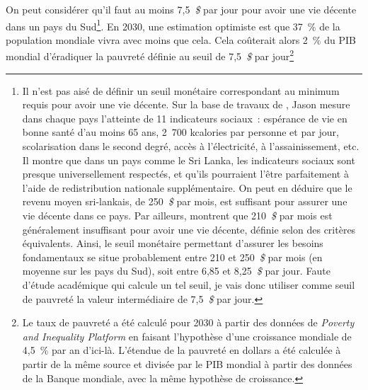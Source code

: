 \documentclass[a5paper,french,openany]{memoir}
\begin{document}
On peut considérer qu'il faut au moins 7,5~\textit{\$} par jour pour avoir une vie décente dans un pays du Sud\footnote{Il n'est pas aisé %
de définir un seuil monétaire correspondant au minimum requis pour avoir une vie décente. Sur la base de travaux de \cite{oneill_good_2018}, Jason \cite{hickel_is_2019} mesure dans chaque pays l'atteinte de 11 indicateurs sociaux~: espérance de vie en bonne santé d'au moins 65 ans, 2~700 kcalories par personne et par jour, scolarisation dans le second degré, accès à l'électricité, à l'assainissement, etc. Il montre que dans un pays comme le Sri Lanka, les indicateurs sociaux sont presque universellement respectés, et qu'ils pourraient l'être parfaitement à l'aide de redistribution nationale supplémentaire. On peut en déduire que le revenu moyen sri-lankais, de 250~\textit{\$} %
par mois, %
est suffisant pour assurer une vie décente dans ce pays. Par ailleurs, \cite{kikstra_decent_2021} montrent que 210~\textit{\$} par mois %
est généralement insuffisant pour avoir une vie décente, définie selon des critères équivalents. Ainsi, le seuil monétaire permettant d'assurer les besoins fondamentaux se situe probablement entre 210 et 250~\textit{\$} par mois (en moyenne sur les pays du Sud), soit entre 6,85 et 8,25~\textit{\$} par jour. Faute d'étude académique qui calcule un tel seuil, je vais donc utiliser comme seuil de pauvreté la valeur intermédiaire de 7,5~\textit{\$} par jour.}. %
En 2030, une estimation optimiste est que 37~\% de la population mondiale vivra avec moins que cela. %
Cela coûterait alors 2~\% %
du PIB mondial d'éradiquer la pauvreté définie au seuil de 7,5~\textit{\$} par jour\footnote{Le taux de pauvreté a été calculé pour 2030 à partir des données de \textit{Poverty and Inequality Platform} en faisant l'hypothèse d'une croissance mondiale de 4,5~\% par an d'ici-là. L'étendue de la pauvreté en dollars a été calculée à partir de la même source et divisée par le PIB mondial à partir des données de la Banque mondiale, avec la même hypothèse de croissance.}%
\end{document}
